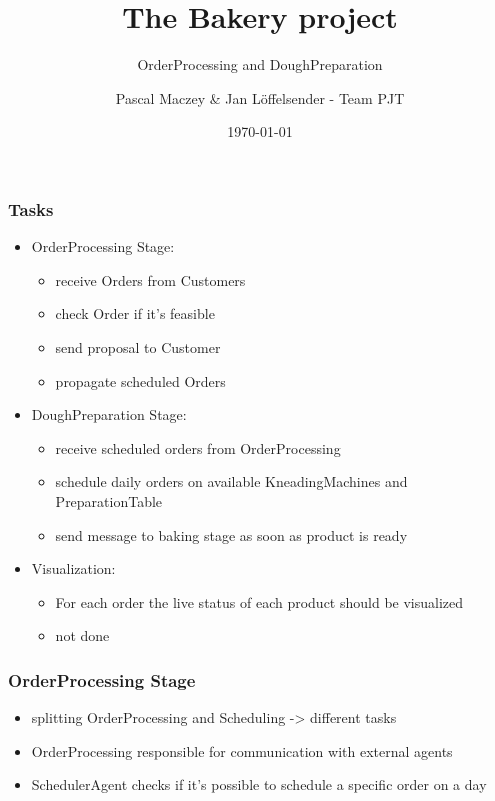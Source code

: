 \documentclass[11pt]{beamer}
\begin{document}
	\author{Pascal Maczey \& Jan Löffelsender - Team PJT}
	\title{The Bakery project}
	\subtitle{OrderProcessing and DoughPreparation}
	\date{\today}
	\begin{frame}[plain]
	\maketitle
\end{frame}

\begin{frame}
\frametitle{Tasks}
\begin{itemize}
	\item OrderProcessing Stage:
	\begin{itemize}
		\item receive Orders from Customers
		\item check Order if it's feasible
		\item send proposal to Customer
		\item propagate scheduled Orders
	\end{itemize}
	\item DoughPreparation Stage:
	\begin{itemize}
		\item receive scheduled orders from OrderProcessing
		\item schedule daily orders on available KneadingMachines and PreparationTable
		\item send message to baking stage as soon as product is ready
	\end{itemize}
	\item Visualization:
	\begin{itemize}
		\item For each order the live status of each product should be visualized
		\item not done
	\end{itemize}
\end{itemize}
\end{frame}

\begin{frame}
\frametitle{OrderProcessing Stage}
\begin{itemize}
	\item splitting OrderProcessing and Scheduling -> different tasks
	\item OrderProcessing responsible for communication with external agents
	\item SchedulerAgent checks if it's possible to schedule a specific order on a day
\end{itemize}
\end{frame}
\end{document}
